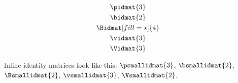 \documentclass[parskip=half]{scrartcl}
\begin{document}
\fulllinerule

\begin{SideBySideExample}[xrightmargin=.45\textwidth,gobble=2]
  \begin{gather*}
    \pidmat{3}\\
    \bidmat{2}\\
    \Bidmat[fill=\star]{4}\\
    \vidmat{3}\\
    \Vidmat{3}
  \end{gather*}
\end{SideBySideExample}

\nopagebreak\fulllinerule

\begin{Example}[gobble=2]
  Inline identity matrices look like this:
  \(\psmallidmat{3}\), \(\bsmallidmat{2}\), \(\Bsmallidmat{2}\),
  \(\vsmallidmat{3}\), \(\Vsmallidmat{2}\).
\end{Example}
\end{document}
